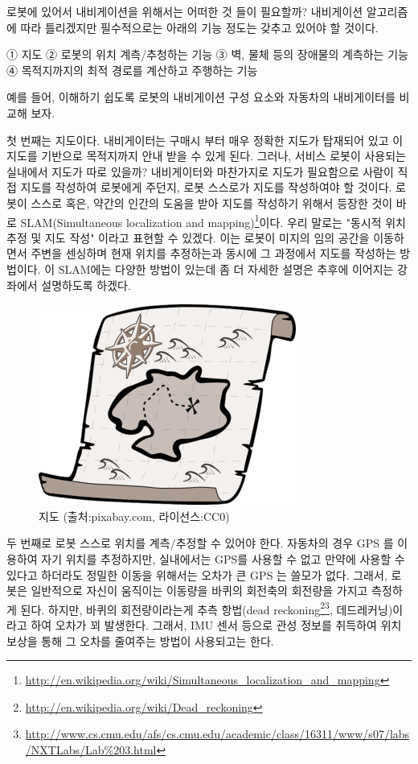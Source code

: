 로봇에 있어서 내비게이션을 위해서는 어떠한 것 들이 필요할까? 내비게이션 알고리즘에 따라 틀리겠지만 필수적으로는 아래의 기능 정도는 갖추고 있어야 할 것이다. 

① 지도
② 로봇의 위치 계측/추청하는 기능
③ 벽, 물체 등의 장애물의 계측하는 기능
④ 목적지까지의 최적 경로를 계산하고 주행하는 기능

예를 들어, 이해하기 쉽도록 로봇의 내비게이션 구성 요소와 자동차의 내비게이터를 비교해 보자.

첫 번째는 지도이다. 내비게이터는 구매시 부터 매우 정확한 지도가 탑재되어 있고 이 지도를 기반으로 목적지까지 안내 받을 수 있게 된다. 그러나, 서비스 로봇이 사용되는 실내에서 지도가 따로 있을까? 내비게이터와 마찬가지로 지도가 필요함으로 사람이 직접 지도를 작성하여 로봇에게 주던지, 로봇 스스로가 지도를 작성하여야 할 것이다. 로봇이 스스로 혹은, 약간의 인간의 도움을 받아 지도를 작성하기 위해서 등장한 것이 바로 SLAM(Simultaneous localization and mapping)\footnote{\url{http://en.wikipedia.org/wiki/Simultaneous_localization_and_mapping}}이다. 우리 말로는 "동시적 위치추정 및 지도 작성" 이라고 표현할 수 있겠다. 이는 로봇이 미지의 임의 공간을 이동하면서 주변을 센싱하며 현재 위치를 추정하는과 동시에 그 과정에서 지도를 작성하는 방법이다. 이 SLAM에는 다양한 방법이 있는데 좀 더 자세한 설명은 추후에 이어지는 강좌에서 설명하도록 하겠다.

\begin{figure}[h]
\centering\includegraphics[width=0.3\columnwidth]{pictures/chapter11/treasure_map.png}
\caption{지도 (출처:pixabay.com, 라이선스:CC0)}
\end{figure}


두 번째로 로봇 스스로 위치를 계측/추정할 수 있어야 한다. 자동차의 경우 GPS 를 이용하여 자기 위치를 추정하지만, 실내에서는 GPS를 사용할 수 없고 만약에 사용할 수 있다고 하더라도 정밀한 이동을 위해서는 오차가 큰 GPS 는 쓸모가 없다. 그래서, 로봇은 일반적으로 자신이 움직이는 이동량을 바퀴의 회전축의 회전량을 가지고 측정하게 된다. 하지만, 바퀴의 회전량이라는게 추측 항법(dead reckoning\footnote{\url{http://en.wikipedia.org/wiki/Dead_reckoning}}\footnote{\url{http://www.cs.cmu.edu/afs/cs.cmu.edu/academic/class/16311/www/s07/labs/NXTLabs/Lab\%203.html}}, 데드레커닝)이라고 하여 오차가 꾀 발생한다. 그래서, IMU 센서 등으로 관성 정보를 취득하여 위치보상을 통해 그 오차를 줄여주는 방법이 사용되고는 한다.


